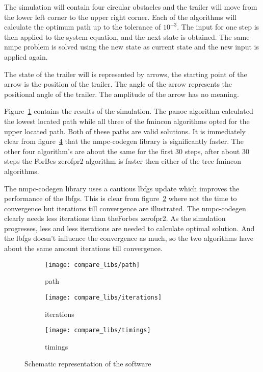 The simulation will contain four circular obstacles and the trailer will move from the lower left corner to the upper right corner. Each of the algorithms will calculate the optimum path up to the tolerance of $10^{-3}$. The input for one step is then applied to the system equation, and the next state is obtained. The same nmpc problem is solved using the new state as current state  and the new input is applied again.

The state of the trailer will is represented by arrows, the starting point of the arrow is the position of the trailer. The angle of the arrow represents the positional angle of the trailer. The amplitude of the arrow has no meaning.

Figure~\ref{fig:solution path trailer example} contains the results of the simulation. The panoc algorithm calculated the lowest located path while all three of the fmincon algorithms opted for the upper located path. Both of these paths are valid solutions. It is immediately clear from figure~\ref{fig:timings trailer example} that the nmpc-codegen library is significantly faster. The other four algorithm's are about the same for the first 30 steps, after about 30 steps the ForBes zerofpr2 algorithm is faster then either of the tree fmincon algorithms.

The nmpc-codegen library uses a cautious lbfgs update which improves the performance of the lbfgs. This is clear from figure~\ref{fig:iterations trailer example} where not the time to convergence but iterations till convergence are illustrated. The nmpc-codegen clearly needs less iterations than theForbes zerofpr2. As the simulation progresses, less and less iterations are needed to calculate optimal solution. And the lbfgs doesn't influence the convergence as much, so the two algorithms have about the same amount iterations till convergence.
\begin{figure}[H]
	\centering
	\begin{subfigure}[b]{0.45\textwidth}
		\centering
		\texttt{[image: compare\_libs/path]}
		\caption{path}
		\label{fig:solution path trailer example}
	\end{subfigure}
	
	\begin{subfigure}[b]{0.45\textwidth}
		\centering
		\texttt{[image: compare\_libs/iterations]}
		\caption{iterations}
		\label{fig:iterations trailer example}
	\end{subfigure}
	\hfill
	\begin{subfigure}[b]{0.45\textwidth}
		\centering
		\texttt{[image: compare\_libs/timings]}
		\caption{timings}
		\label{fig:timings trailer example}
	\end{subfigure}
	\caption{Schematic representation of the software}
\end{figure}

